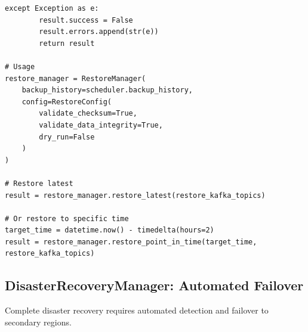 \begin{lstlisting}[style=python, caption={Restore Manager with Validation}]
    except Exception as e:
        result.success = False
        result.errors.append(str(e))
        return result

# Usage
restore_manager = RestoreManager(
    backup_history=scheduler.backup_history,
    config=RestoreConfig(
        validate_checksum=True,
        validate_data_integrity=True,
        dry_run=False
    )
)

# Restore latest
result = restore_manager.restore_latest(restore_kafka_topics)

# Or restore to specific time
target_time = datetime.now() - timedelta(hours=2)
result = restore_manager.restore_point_in_time(target_time, restore_kafka_topics)
\end{lstlisting}

\subsection{DisasterRecoveryManager: Automated Failover}

Complete disaster recovery requires automated detection and failover to secondary regions.

